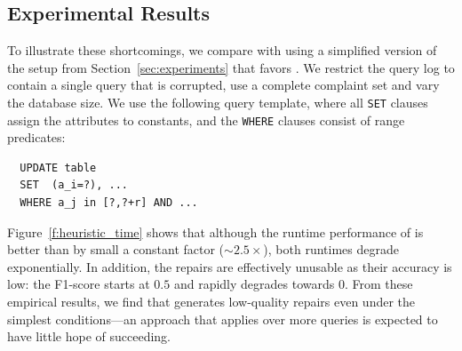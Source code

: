 \subsection{Experimental Results}

To illustrate these shortcomings, we compare \dt with \sys using a simplified version of the setup from Section~\ref{sec:experiments} that favors \dt.
We restrict the query log to contain a single query that is corrupted, use a complete complaint set  and vary the database size.
We use the following query template, where all \texttt{SET} clauses assign the attributes to constants,
and the \texttt{WHERE} clauses consist of range predicates:

{\scriptsize
\begin{verbatim}
  UPDATE table
  SET  (a_i=?), ...
  WHERE a_j in [?,?+r] AND ...
\end{verbatim}
}

Figure~\ref{f:heuristic_time} shows that although the runtime performance of \dt is better than \sys by small a constant factor ($\sim 2.5 \times$),
both runtimes degrade exponentially.
In addition, the \dt repairs are effectively unusable as their accuracy is low: the F1-score starts at $0.5$ and rapidly degrades towards $0$.
From these empirical results, we find that \dt generates low-quality repairs even under the simplest conditions---an approach
that applies \dt over more queries is expected to have little hope of succeeding.



